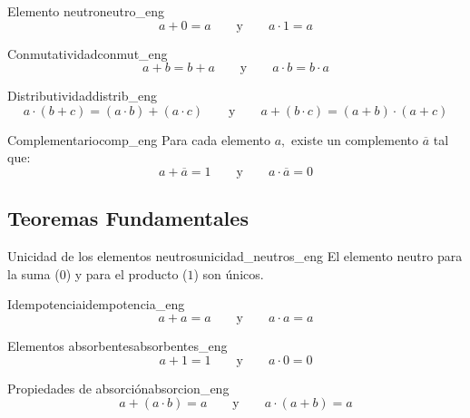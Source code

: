 \setcounter{tcb@cnt@postulado}{0}
\begin{postulado}{Elemento neutro}{neutro_eng}
\[ a + 0 = a \qquad \text{y} \qquad a \cdot 1 = a \]
\end{postulado}

\setcounter{tcb@cnt@postulado}{2}
\begin{postulado}{Conmutatividad}{conmut_eng}
\[ a + b = b + a \qquad \text{y} \qquad a \cdot b = b \cdot a \]
\end{postulado}

\setcounter{tcb@cnt@postulado}{4}
\begin{postulado}{Distributividad}{distrib_eng}
\[ a \cdot (b + c) = (a \cdot b) + (a \cdot c) \qquad \text{y} \qquad a + (b \cdot c) = (a + b) \cdot (a + c) \]
\end{postulado}

\setcounter{tcb@cnt@postulado}{6}
\begin{postulado}{Complementario}{comp_eng}
Para cada elemento $a,$ existe un complemento $\overline{a}$ tal que:
\[ a + \overline{a} = 1 \qquad \text{y} \qquad a \cdot \overline{a} = 0 \]
\end{postulado}

\subsection*{Teoremas Fundamentales}

\setcounter{tcb@cnt@teorema}{0}
\begin{teorema}{Unicidad de los elementos neutros}{unicidad_neutros_eng}
El elemento neutro para la suma ($0$) y para el producto ($1$) son únicos.
\end{teorema}

\setcounter{tcb@cnt@teorema}{1}
\begin{teorema}{Idempotencia}{idempotencia_eng}
\[ a + a = a \qquad \text{y} \qquad a \cdot a = a \]
\end{teorema}

\setcounter{tcb@cnt@teorema}{2}
\begin{teorema}{Elementos absorbentes}{absorbentes_eng}
\[ a + 1 = 1 \qquad \text{y} \qquad a \cdot 0 = 0 \]
\end{teorema}

\setcounter{tcb@cnt@teorema}{5}
\begin{teorema}{Propiedades de absorción}{absorcion_eng}
\[ a + (a \cdot b) = a \qquad \text{y} \qquad a \cdot (a + b) = a \]
\end{teorema}

